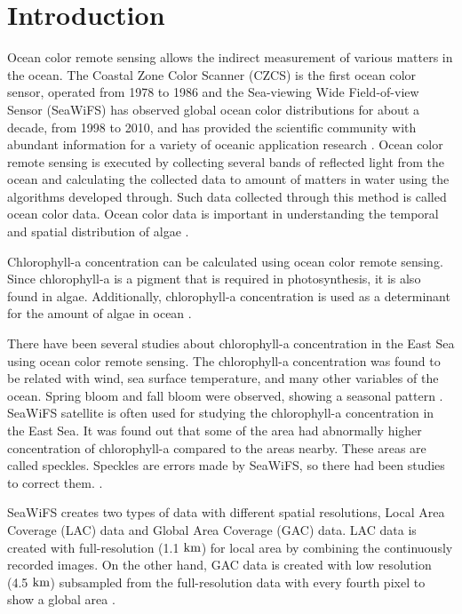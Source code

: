 \section{Introduction}

Ocean color remote sensing allows the indirect measurement of various matters in the ocean. The Coastal Zone Color Scanner (CZCS) is the first ocean color sensor, operated from 1978 to 1986 and the Sea-viewing Wide Field-of-view Sensor (SeaWiFS) has observed global ocean color distributions for about a decade, from 1998 to 2010, and has provided the scientific community with abundant information for a variety of oceanic application research \cite{kyung2013characteristics, hooker1992An}. Ocean color remote sensing is executed by collecting several bands of reflected light from the ocean and calculating the collected data to amount of matters in water using the algorithms developed through. Such data collected through this method is called ocean color data. Ocean color data is important in understanding the temporal and spatial distribution of algae \cite{kimhc2016surface}.

Chlorophyll-a concentration can be calculated using ocean color remote sensing. Since chlorophyll-a is a pigment that is required in photosynthesis, it is also found in algae. Additionally, chlorophyll-a concentration is used as a determinant for the amount of algae in ocean \cite{o2000ocean}. 

There have been several studies about chlorophyll-a concentration in the East Sea using ocean color remote sensing. The chlorophyll-a concentration was found to be related with wind, sea surface temperature, and many other variables of the ocean. Spring bloom and fall bloom were observed, showing a seasonal pattern \cite{yamada2004seasonal}. SeaWiFS satellite is often used for studying the chlorophyll-a concentration in the East Sea. It was found out that some of the area had abnormally higher concentration of chlorophyll-a compared to the areas nearby. These areas are called speckles. Speckles are errors made by SeaWiFS, so there had been studies to correct them. \cite{chae2009characteristics}. 

SeaWiFS creates two types of data with different spatial resolutions, Local Area Coverage (LAC) data and Global Area Coverage (GAC) data. LAC data is created with full-resolution (1.1 $\rm km$) for local area by combining the continuously recorded images. On the other hand, GAC data is created with low resolution (4.5 $\rm km$) subsampled from the full-resolution data with every fourth pixel to show a global area \cite{Seawifsres}. 

